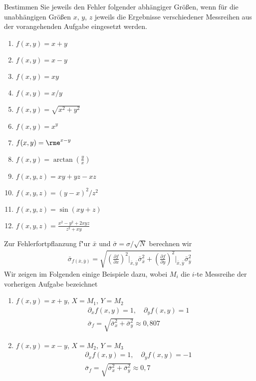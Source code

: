 \documentclass[11pt,answers]{exam}
\begin{document}
\begin{questions}
Bestimmen Sie jeweils den Fehler folgender abhängiger Größen, wenn für die
unabhängigen Größen $x$, $y$, $z$ jeweils die Ergebnisse verschiedener
Messreihen aus der vorangehenden Aufgabe eingesetzt werden.\\
\parbox{0.5\textwidth}{\begin{enumerate}
\item $f(x,y)=x+y$
\item $f(x,y)=x-y$
\item $f(x,y)=xy$
\item $f(x,y)=x/y$
\item $f(x,y)=\sqrt{x^2+y^2}$
\item $f(x,y)=x^y$
\end{enumerate}}\parbox{0.5\textwidth}{\begin{enumerate}\setcounter{enumi}{6}
\item $f(x,y)=\rme^{x-y}$
\item $f(x,y)=\arctan\left(\frac{y}{x}\right)$
\item $f(x,y,z)=xy+yz-xz$
\item $f(x,y,z)=(y-x)^2/z^2$
\item $f(x,y,z)=\sin(xy+z)$
\item $f(x,y,z)=\frac{x^2-y^2+2xyz}{z^2+xy}$
\end{enumerate}}
\begin{solution}
Zur Fehlerfortpflanzung f"ur $\bar x$ und $\bar \sigma=\sigma/\sqrt{N}$ berechnen wir
\begin{align*}
\bar \sigma_{f(\bar x,\bar y)}=
\sqrt{
\left(\frac{\partial f}{\partial x}\right)^2\Bigg|_{\bar x,\bar y}\bar\sigma_{\bar x}^2
+
\left(\frac{\partial f}{\partial y}\right)^2\Bigg|_{\bar x,\bar y}\bar\sigma_{\bar y}^2}
\end{align*}
Wir zeigen im Folgenden einige Beispiele dazu, wobei $M_i$ die $i$-te Messreihe der vorherigen Aufgabe bezeichnet
\begin{enumerate}
\item $f(x,y)=x+y$, $X=M_1$, $Y=M_2$
\begin{align*}
&
\partial_xf(x,y)=1
,\quad
\partial_yf(x,y)=1
\\
&
\bar \sigma_{f}=\sqrt{\bar\sigma_x^2+\bar\sigma_y^2}\approx 0,807
\end{align*}
\item $f(x,y)=x-y$, $X=M_2$, $Y=M_3$
\begin{align*}
&
\partial_xf(x,y)=1
,\quad
\partial_yf(x,y)=-1
\\
&
\bar \sigma_{f}=\sqrt{\bar\sigma_x^2+\bar\sigma_y^2}\approx 0,7

\end{align*}
\end{enumerate}
\end{solution}
\end{questions}
\end{document}
